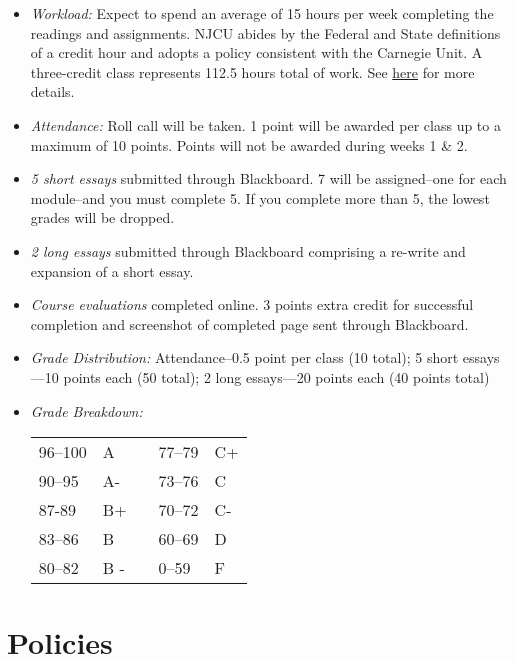 \documentclass[article,oneside]{memoir}
\begin{document}
\begin{itemize}
\item \textit{Workload:} Expect to spend an average of 15 hours per week completing the readings and assignments. NJCU abides by the Federal and State definitions of a credit hour and adopts a policy consistent with the Carnegie Unit. A three-credit class represents 112.5 hours total of work. See \href{http://scottoconnor.org/resources/Credit.pdf}{here} for more details.

\item \textit{Attendance:} Roll call will be taken. 1 point will be awarded per class up to a maximum of 10 points. Points will not be awarded during weeks 1 \& 2.  

\item \textit{5 short essays} submitted through Blackboard. 7 will be assigned--one for each module--and you must complete 5. If you complete more than 5, the lowest grades will be dropped.  
 
\item \textit{2 long essays} submitted through Blackboard comprising a re-write and expansion of a short essay. 

\item \textit{Course evaluations} completed online. 3 points extra credit for successful completion  and screenshot of completed page sent through Blackboard. 

\item \textit{Grade Distribution:} Attendance--0.5 point per class (10 total); 5 short essays---10 points each (50 total); 2 long essays---20 points each (40 points total)

\item \textit{Grade Breakdown:}

 \begin{tabular}{ | l | l | p{2cm} | l | l | }
    \hline 
96--100 & A  & &  77--79 &  C+ \\  
90--95 & A- & &  73--76 & C \\
87-89 & B+ &  &  70--72 & C- \\ 
83--86 & B  & &  60--69 & D\\
80--82 & B - & & 0--59 & F\\ \hline
    \end{tabular}


\end{itemize}





\section{Policies}
\end{document}
